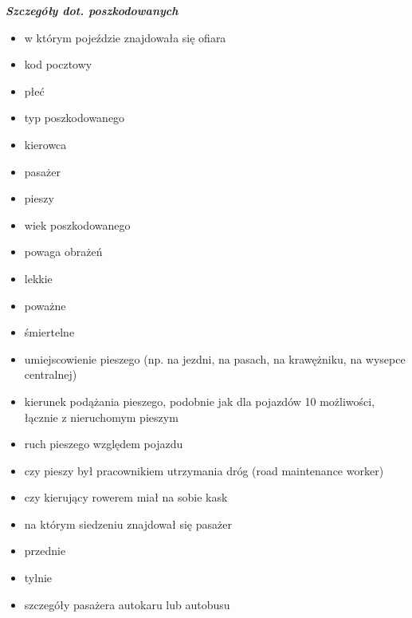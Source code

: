 \textbf{\emph{Szczegóły dot. poszkodowanych}}

\begin{itemize}
\itemsep-14pt\parskip0pt
\item
  w którym pojeździe znajdowała się ofiara\\
\item
  kod pocztowy\\
\item
  płeć\\
\item
  typ poszkodowanego\\
\item
  kierowca\\
\item
  pasażer\\
\item
  pieszy\\
\item
  wiek poszkodowanego\\
\item
  powaga obrażeń\\
\item
  lekkie\\
\item
  poważne\\
\item
  śmiertelne\\
\item
  umiejscowienie pieszego (np. na jezdni, na pasach, na krawężniku, na
  wysepce centralnej)\\
\item
  kierunek podążania pieszego, podobnie jak dla pojazdów 10 możliwości,
  łącznie z nieruchomym pieszym\\
\item
  ruch pieszego względem pojazdu\\
\item
  czy pieszy był pracownikiem utrzymania dróg (road maintenance
  worker)\\
\item
  czy kierujący rowerem miał na sobie kask\\
\item
  na którym siedzeniu znajdował się pasażer\\
\item
  przednie\\
\item
  tylnie\\
\item
  szczegóły pasażera autokaru lub autobusu\\

\end{itemize}

